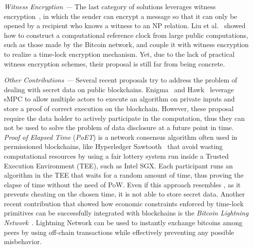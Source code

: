 \smallskip
{\em Witness Encryption ---} The last category of solutions leverages witness encryption~\cite{Garg:2013:WEA:2488608.2488667}, in which the sender can encrypt a message so that it can only be opened by a recipient who knows a witness to an NP relation. Liu et al.~\cite{jager2018} showed how to construct a computational reference clock from large public computations, such as those made by the Bitcoin network, and couple it with witness encryption to realize a time-lock encryption mechanism. Yet, due to the lack of practical witness encryption schemes, their proposal is still far from being concrete.

\smallskip
{\em Other Contributions ---}
Several recent proposals try to address the problem of dealing with secret data on public blockchains. Enigma~\cite{enigma} and Hawk~\cite{hawk} leverage sMPC to allow multiple actors to execute an algorithm on private inputs and store a proof of correct execution on the blockchain.
However, these proposal require the data holder to actively participate in the computation, thus they can not be used to solve the problem of data disclosure at a future point in time.
%
{\em Proof of Elapsed Time} ({\em PoET}) is a network consensus algorithm often used in permissioned blockchains, like Hyperledger Sawtooth~\cite{poet,hyperledger-sawtooth} that avoid wasting computational resources by using a fair lottery system run inside a Trusted Execution Environment (TEE), such as Intel SGX. Each participant runs an algorithm in the TEE that waits for a random amount of time, thus proving the elapse of time without the need of PoW. Even if this approach resembles \shortname, as it prevents cheating on the chosen time, it is not able to store secret data.
%
Another recent contribution that showed how economic constraints enforced by time-lock primitives can be successfully integrated with blockchains is the {\em Bitcoin Lightning Network}~\cite{poon2016bitcoin}. Lightning Network can be used to instantly exchange bitcoins among peers by using off-chain transactions while effectively preventing any possible misbehavior.